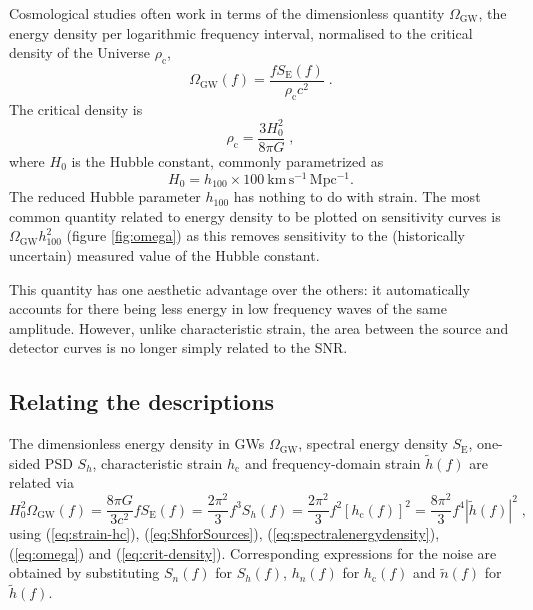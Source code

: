 Cosmological studies often work in terms of the dimensionless quantity $\Omega_{\mathrm{GW}}$, the energy density per logarithmic frequency interval, normalised to the critical density of the Universe $\rho_{\mathrm{c}}$,
\begin{equation}
\label{eq:omega}
\Omega_\mathrm{GW}(f) = \frac{fS_{\mathrm{E}}(f)}{\rho_{\mathrm{c}}c^{2}} \; .
\end{equation}
The critical density is
\begin{equation}
\label{eq:crit-density}
\rho_{\mathrm{c}}=\frac{3H_{0}^{2}}{8\pi G} \;,
\end{equation}
where $H_{0}$ is the Hubble constant, commonly parametrized as
\begin{equation}
H_0 = h_{100}\times 100~\mathrm{km\,s^{-1}\,Mpc^{-1}}.
\end{equation}
The reduced Hubble parameter $h_{100}$ has nothing to do with strain. The most common quantity related to energy density to be plotted on sensitivity curves is $\Omega_{\mathrm{GW}}h_{100}^{2}$ (figure \ref{fig:omega}) as this removes sensitivity to the (historically uncertain) measured value of the Hubble constant.

This quantity has one aesthetic advantage over the others: it automatically accounts for there being less energy in low frequency waves of the same amplitude. However, unlike characteristic strain, the area between the source and detector curves is no longer simply related to the SNR.

\subsection{Relating the descriptions}

The dimensionless energy density in GWs $\Omega_{\mathrm{GW}}$, spectral energy density $S_{\mathrm{E}}$, one-sided PSD $S_{h}$, characteristic strain $h_\mathrm{c}$ and frequency-domain strain $\tilde{h}(f)$ are related via
\begin{equation}\label{eq:differentdescriptions}
H_0^2\Omega_\mathrm{GW}(f)= \frac{8 \pi G}{3 c^{2}} fS_{\mathrm{E}}(f) = \frac{2\pi^2}{3} f^3 S_h(f) = \frac{2\pi^2}{3} f^2 \left[h_\mathrm{c}(f)\right]^2 = \frac{8\pi^2}{3} f^4 \left|\tilde{h}(f)\right|^2\; ,
\end{equation}
using (\ref{eq:strain-hc}), (\ref{eq:ShforSources}), (\ref{eq:spectralenergydensity}), (\ref{eq:omega}) and (\ref{eq:crit-density}).
Corresponding expressions for the noise are obtained by substituting $S_{n}(f)$ for $S_h(f)$, $h_{n}(f)$ for $h_\mathrm{c}(f)$ and $\tilde{n}(f)$ for $\tilde{h}(f)$. 

